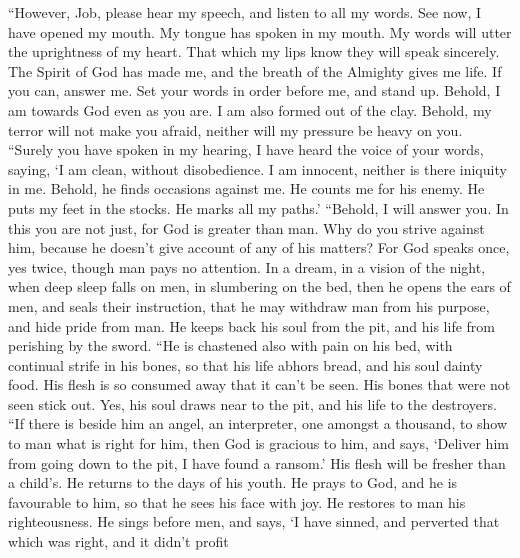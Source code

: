  ``However, Job, please hear my speech, and listen to all
my words.  See now, I have opened my mouth. My tongue has
spoken in my mouth.  My words will utter the uprightness
of my heart. That which my lips know they will speak sincerely.
 The Spirit of God has made me, and the breath of the
Almighty gives me life.  If you can, answer me. Set your
words in order before me, and stand up.  Behold, I am
towards God even as you are. I am also formed out of the clay.
 Behold, my terror will not make you afraid, neither will
my pressure be heavy on you.  ``Surely you have spoken in
my hearing, I have heard the voice of your words, saying, 
`I am clean, without disobedience. I am innocent, neither is there
iniquity in me.  Behold, he finds occasions against me.
He counts me for his enemy.  He puts my feet in the
stocks. He marks all my paths.'  ``Behold, I will answer
you. In this you are not just, for God is greater than man.
 Why do you strive against him, because he doesn't give
account of any of his matters?  For God speaks once, yes
twice, though man pays no attention.  In a dream, in a
vision of the night, when deep sleep falls on men, in slumbering on the
bed,  then he opens the ears of men, and seals their
instruction,  that he may withdraw man from his purpose,
and hide pride from man.  He keeps back his soul from the
pit, and his life from perishing by the sword.  ``He is
chastened also with pain on his bed, with continual strife in his bones,
 so that his life abhors bread, and his soul dainty food.
 His flesh is so consumed away that it can't be seen. His
bones that were not seen stick out.  Yes, his soul draws
near to the pit, and his life to the destroyers.  ``If
there is beside him an angel, an interpreter, one amongst a thousand, to
show to man what is right for him,  then God is gracious
to him, and says, `Deliver him from going down to the pit, I have found
a ransom.'  His flesh will be fresher than a child's. He
returns to the days of his youth.  He prays to God, and
he is favourable to him, so that he sees his face with joy. He restores
to man his righteousness.  He sings before men, and says,
`I have sinned, and perverted that which was right, and it didn't profit
